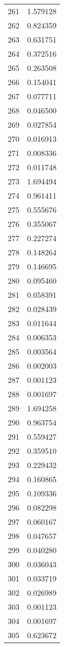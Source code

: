 \documentclass[12pt]{article}
\begin{document}
\begin{longtable}{@{}cc@{}}
261 & 1.579128 \\
262 & 0.824359 \\
263 & 0.631751 \\
264 & 0.372516 \\
265 & 0.263508 \\
266 & 0.154041 \\
267 & 0.077711 \\
268 & 0.046500 \\
269 & 0.027854 \\
270 & 0.016913 \\
271 & 0.008336 \\
272 & 0.011748 \\
273 & 1.694494 \\
274 & 0.961411 \\
275 & 0.555676 \\
276 & 0.355067 \\
277 & 0.227274 \\
278 & 0.148264 \\
279 & 0.146695 \\
280 & 0.095460 \\
281 & 0.058391 \\
282 & 0.028439 \\
283 & 0.011644 \\
284 & 0.006353 \\
285 & 0.003564 \\
286 & 0.002003 \\
287 & 0.001123 \\
288 & 0.001697 \\
289 & 1.694258 \\
290 & 0.963754 \\
291 & 0.559427 \\
292 & 0.359510 \\
293 & 0.229432 \\
294 & 0.160865 \\
295 & 0.109336 \\
296 & 0.082298 \\
297 & 0.060167 \\
298 & 0.047657 \\
299 & 0.040280 \\
300 & 0.036043 \\
301 & 0.033719 \\
302 & 0.026989 \\
303 & 0.001123 \\
304 & 0.001697 \\
305 & 0.623672 \\

\end{longtable}
\end{document}
